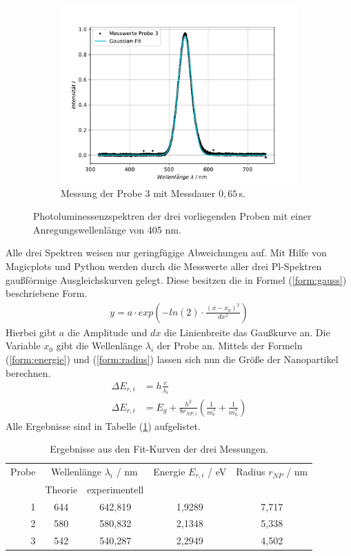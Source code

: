 \begin{figure}[H]
\begin{subfigure}[t]{0.4\textwidth}
	\includegraphics[width=\textwidth]{Plots/aufgabe1a_P3.pdf}
	\caption{Messung der Probe 3 mit Messdauer $0,65 \,$s.}
	\label{abb:A1_P3}
	\end{subfigure}
\caption{Photoluminessenzspektren der drei vorliegenden Proben mit einer Anregungswellenl\"{a}nge von 405 nm.}
\label{abb:auf1a}
\end{figure}
Alle drei Spektren weisen nur geringf\"{u}gige Abweichungen auf.
Mit Hilfe von Magicplots und Python werden durch die Messwerte aller drei Pl-Spektren gau{\ss}f\"{o}rmige Ausgleichskurven gelegt.
Diese besitzen die in Formel (\ref{form:gauss}) beschriebene Form.
\begin{align}
	y = a \cdot exp \left( -ln(2) \cdot \frac{(x-x_0)^2}{dx^2} \right)
\label{form:gauss}
\end{align}
Hierbei gibt $a$ die Amplitude und $dx$ die Linienbreite das Gau{\ss}kurve an.
Die Variable $x_0$ gibt die Wellenl\"{a}nge $\lambda_i$ der Probe an.
Mittels der Formeln (\ref{form:energie}) und (\ref{form:radius}) lassen sich nun die Gr\"{o}{\ss}e der Nanopartikel berechnen.
\begin{align}
	\Delta E_{r,i} &= h \frac{c}{\lambda_i} \label{form:energie}\\
	\Delta E_{r,i} &= E_g + \frac{h^2}{8r_{NP,i}} \left( \frac{1}{m_e^*} + \frac{1}{m_h^*} \right) \label{form:radius}
\end{align}
Alle Ergebnisse sind in Tabelle (\ref{tab:auf1a}) aufgelistet.
\begin{table}
	\centering
	\caption{Ergebnisse aus den Fit-Kurven der drei Messungen.}
\begin{tabular}{|r|cccc|}
	\hline
	{Probe} & \multicolumn{2}{c}{Wellenl\"{a}nge $\lambda_i$ / nm} & {Energie $E_{r,i}$ / eV} & {Radius $r_{NP}$ / nm} \\
	 & Theorie & experimentell &  &  \\
	\hline
	1	&	644	& 642,819 &	1,9289	&	7,717	\\
	2	&	580	& 580,832 &	2,1348	&	5,338	\\
	3	&	542	& 540,287 &	2,2949	&	4,502	\\
	\hline
\end{tabular}
\label{tab:auf1a}
\end{table}


